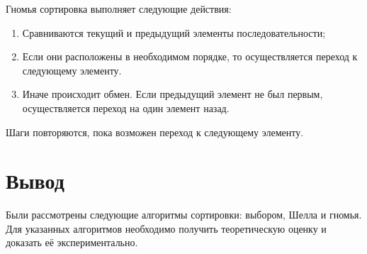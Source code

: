 Гномья сортировка выполняет следующие действия:

\begin{enumerate}
	\item Сравниваются текущий и предыдущий элементы последовательности;
	\item Если они расположены в необходимом порядке, то осуществляется переход к следующему элементу.
	\item Иначе происходит обмен. Если предыдущий элемент не был первым, осуществляется переход на один элемент назад.
\end{enumerate}

Шаги повторяются, пока возможен переход к следующему элементу.

\section*{Вывод}

Были рассмотрены следующие алгоритмы сортировки: выбором, Шелла и гномья. Для указанных алгоритмов необходимо получить теоретическую оценку и доказать её экспериментально.
